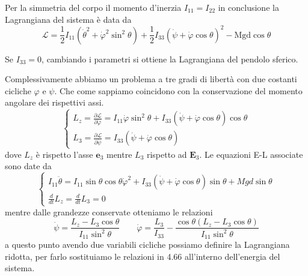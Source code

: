 \newpage 
\noindent Per la simmetria del corpo il momento d'inerzia $I_{11} = I_{22}$ in conclusione la Lagrangiana del sistema \`{e} data da 
\begin{equation}
	\boxed{\mathcal{L} = \frac{1}{2} I_{11} \left ( \dot{\theta}^2 + \dot{\varphi}^2\sin^2\theta \right ) + \frac{1}{2}I_{33} \left ( \dot{\psi} + \dot{\varphi} \cos\theta \right )^2 - \text{Mgd}\cos \theta} 
\end{equation}

\begin{remark}
Se $I_{33} = 0$, cambiando i parametri si ottiene la Lagrangiana del pendolo sferico. 	
\end{remark}
\noindent Complessivamente abbiamo un problema a tre gradi di libert\`{a} con due costanti cicliche $\varphi$ e $\psi$. Che come sappiamo coincidono con la conservazione del momento angolare dei rispettivi assi.
\begin{equation}
	\left \{ \begin{array}{l}
		L_{z} = \frac{\partial \mathcal{L} }{\partial \dot{\varphi}} = I_{11}\dot{\varphi}\sin^2\theta + I_{33} \left ( \dot{\psi} + \dot{\varphi} \cos\theta \right )\cos \theta \\[0.2in]
		L_{3} = \frac{\partial \mathcal{L} }{\partial \dot{\psi}} = I_{33} \left ( \dot{\psi} + \dot{\varphi} \cos\theta \right )
	\end{array} \right.
\end{equation}
dove $L_{z}$ \`{e} rispetto l'asse $\bm{e}_{3}$ mentre $L_{3}$ rispetto ad $\bm{E}_{3}$.
Le equazioni E-L associate sono date da
\begin{equation}
	\left \{ \begin{array}{l}
		I_{11}\ddot{\theta} = I_{11} \sin \theta \cos \theta \dot{\varphi}^2 + I_{33} \left ( \dot{\psi} + \dot{\varphi} \cos\theta \right ) \sin \theta + Mgd \sin \theta \\[0.2in]
		\frac{d}{dt}L_{z} = \frac{d}{dt}L_{3} = 0
	\end{array} \right.
\end{equation}
mentre dalle grandezze conservate otteniamo le relazioni 
\begin{equation}
	\dot{\psi} = \frac{L_{z} - L_{3}\cos \theta}{I_{11} \sin^2 \theta } \quad \quad \dot{\varphi} = \frac{L_{3}}{I_{33}} - \frac{\cos \theta \left ( L_{z} - L_{3} \cos \theta \right)}{I_{11} \sin^2 \theta }
\end{equation}
a questo punto avendo due variabili cicliche possiamo definire la Lagrangiana ridotta, per farlo sostituiamo le relazioni in 4.66 all'interno dell'energia del sistema. 
